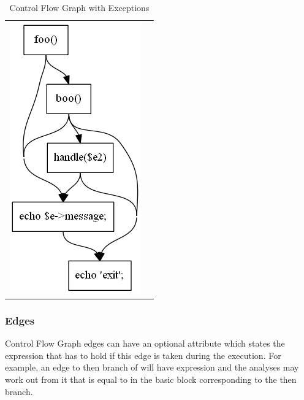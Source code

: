 \begin{table}[h]
  \begin{tabular}{ l | m{6cm} }
  \centering
    \includegraphics[scale=0.7]{src/throw.png}
  &
 
\begin{minipage}{6cm}
%    
\end{minipage}

  \\
  \end{tabular}
  \caption{Control Flow Graph with Exceptions\label{cfgthrow}}  
\end{table}
        
        \subsubsection*{Edges}
        Control Flow Graph edges can have an optional attribute which 
        states the expression that has to hold if this edge is taken 
        during the execution. For example, an edge to then branch of 
         will have expression  and the 
        analyses may work out from it that  is equal to 
         in the basic block corresponding to the then branch.
        
